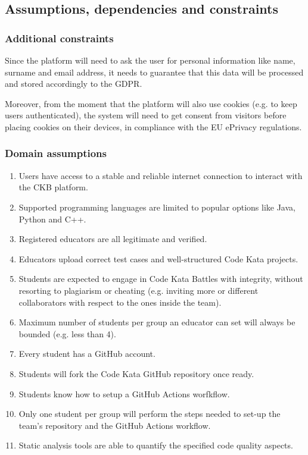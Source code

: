 \subsection{Assumptions, dependencies and constraints}
\subsubsection{Additional constraints}
Since the platform will need to ask the user for personal information like name, surname and email address, it needs to guarantee that this data will be processed and stored accordingly to the GDPR.

Moreover, from the moment that the platform will also use cookies (e.g. to keep users authenticated), the system will need to get consent from visitors before placing cookies on their devices, in compliance with the EU ePrivacy regulations.
\subsubsection{Domain assumptions}
\begin{enumerate}[label=$\bullet$ \textbf{D\arabic*:}]
    \item Users have access to a stable and reliable internet connection to interact with the CKB platform.
    \item Supported programming languages are limited to popular options like Java, Python and C++.
    \item Registered educators are all legitimate and verified.
    \item Educators upload correct test cases and well-structured Code Kata projects.
    \item Students are expected to engage in Code Kata Battles with integrity, without resorting to plagiarism or cheating (e.g. inviting more or different collaborators with respect to the ones inside the team).
    \item Maximum number of students per group an educator can set will always be bounded (e.g. less than 4).
    \item Every student has a GitHub account.
    \item Students will fork the Code Kata GitHub repository once ready.
    \item Students know how to setup a GitHub Actions worfkflow.
    \item Only one student per group will perform the steps needed to set-up the team's repository and the GitHub Actions workflow.
    \item Static analysis tools are able to quantify the specified code quality aspects.
\end{enumerate}